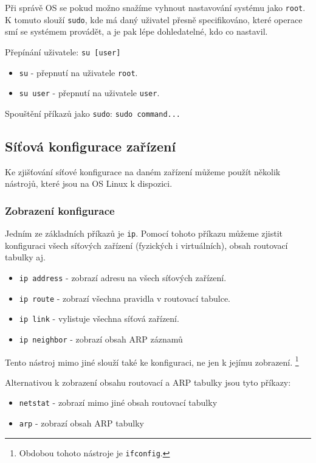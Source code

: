Při správě OS se pokud možno snažíme vyhnout nastavování systému jako \texttt{root}. K tomuto slouží \texttt{sudo},
kde má daný uživatel přesně specifikováno, které operace smí se systémem provádět, a je pak lépe dohledatelné,
kdo co nastavil.

Přepínání uživatele:
\texttt{su [user]}
\begin{itemize}
				\item \texttt{su} - přepnutí na uživatele \texttt{root}.
				\item \texttt{su user} - přepnutí na uživatele \texttt{user}.
\end{itemize}

Spouštění příkazů jako \texttt{sudo}:
\texttt{sudo command...}


\subsection{Síťová konfigurace zařízení}
Ke zjišťování síťové konfigurace na daném zařízení můžeme použít několik nástrojů,
které jsou na OS Linux k dispozici.

\subsubsection{Zobrazení konfigurace}
Jedním ze základních příkazů je \texttt{ip}. Pomocí tohoto příkazu můžeme zjistit
konfiguraci všech síťových zařízení (fyzických i virtuálních), obsah routovací tabulky aj.

\begin{itemize}
				\item \texttt{ip address} - zobrazí adresu na všech síťových zařízení.
				\item \texttt{ip route} - zobrazí všechna pravidla v routovací tabulce.
				\item \texttt{ip link} - vylistuje všechna síťová zařízení.
				\item \texttt{ip neighbor} - zobrazí obsah ARP záznamů
\end{itemize}

Tento nástroj mimo jiné slouží také ke konfiguraci, ne jen k jejímu zobrazení. \footnote{Obdobou tohoto nástroje je \texttt{ifconfig}.}


Alternativou k zobrazení obsahu routovací a ARP tabulky jsou tyto příkazy:
\begin{itemize}
\item \texttt{netstat} - zobrazí mimo jiné obsah routovací tabulky
\item \texttt{arp} - zobrazí obsah ARP tabulky
\end{itemize}


